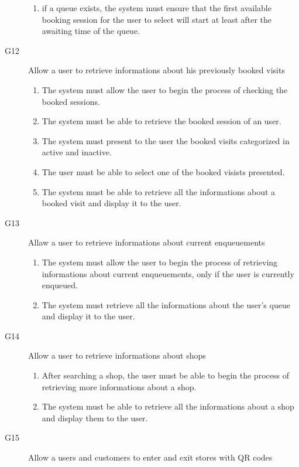 \begin{description}
\begin{enumerate}[resume*]
            \item if a queue exists, the system must ensure that the first available booking session for the user to select will start at least after the awaiting time of the queue.
        \end{enumerate}
    \item [G12] Allow a user to retrieve informations about his previously booked visits
        \begin{enumerate}[resume*]
            \item The system must allow the user to begin the process of checking the booked sessions.
            \item The system must be able to retrieve the booked session of an user.
            \item The system must present to the user the booked visits categorized in active and inactive.
            \item The user must be able to select one of the booked visists presented.
            \item The system must be able to retrieve all the informations about a booked visit and display it to the user.
        \end{enumerate}
    \item [G13] Allaw a user to retrieve informations about current enqueuements
        \begin{enumerate}[resume*]
            \item The system must allow the user to begin the process of retrieving informations about current enqueuements, only if the user is currently enqueued.
            \item The system must retrieve all the informations about the user's queue and display it to the user.
        \end{enumerate}
    \item [G14] Allow a user to retrieve informations about shops 
        \begin{enumerate}[resume*]
            \item After searching a shop, the user must be able to begin the process of retrieving more informations about a shop.
            \item The system must be able to retrieve all the informations about a shop and display them to the user.
        \end{enumerate}
    \item [G15] Allow a users and customers to enter and exit stores with QR codes
        \begin{enumerate}[resume*]

\end{enumerate}
\end{description}
